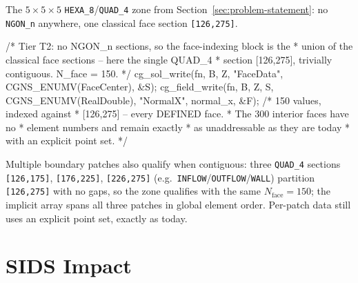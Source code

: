 \documentclass[11pt,letterpaper]{article}
\makeatletter
\let\cgns@orig@lstlisting\lstlisting
\let\cgns@endorig@lstlisting\endlstlisting
\renewenvironment{lstlisting}
  {\par\needspace{5\baselineskip}\nolinenumbers\cgns@orig@lstlisting}
  {\cgns@endorig@lstlisting\par\linenumbers}
\makeatother
\begin{document}
The $5{\times}5{\times}5$ \texttt{HEXA\_8}/\texttt{QUAD\_4} zone from
Section~\ref{sec:problem-statement}: no \texttt{NGON\_n} anywhere, one
classical face section \texttt{[126,275]}.

\begin{lstlisting}[language=C]
/* Tier T2: no NGON_n sections, so the face-indexing block is the
 * union of the classical face sections -- here the single QUAD_4
 * section [126,275], trivially contiguous. N_face = 150. */
cg_sol_write(fn, B, Z, "FaceData", CGNS_ENUMV(FaceCenter), &S);
cg_field_write(fn, B, Z, S, CGNS_ENUMV(RealDouble), "NormalX",
               normal_x, &F);   /* 150 values, indexed against
                                 * [126,275] -- every DEFINED face.
                                 * The 300 interior faces have no
                                 * element numbers and remain exactly
                                 * as unaddressable as they are today
                                 * with an explicit point set. */
\end{lstlisting}

Multiple boundary patches also qualify when contiguous: three
\texttt{QUAD\_4} sections \texttt{[126,175]}, \texttt{[176,225]},
\texttt{[226,275]} (e.g.\ \texttt{INFLOW}/\texttt{OUTFLOW}/\texttt{WALL})
partition \texttt{[126,275]} with no gaps, so the zone qualifies with the
same $N_{\mathrm{face}} = 150$; the implicit array spans all three
patches in global element order. Per-patch data still uses an explicit
point set, exactly as today.

\section{SIDS Impact}
\end{document}
